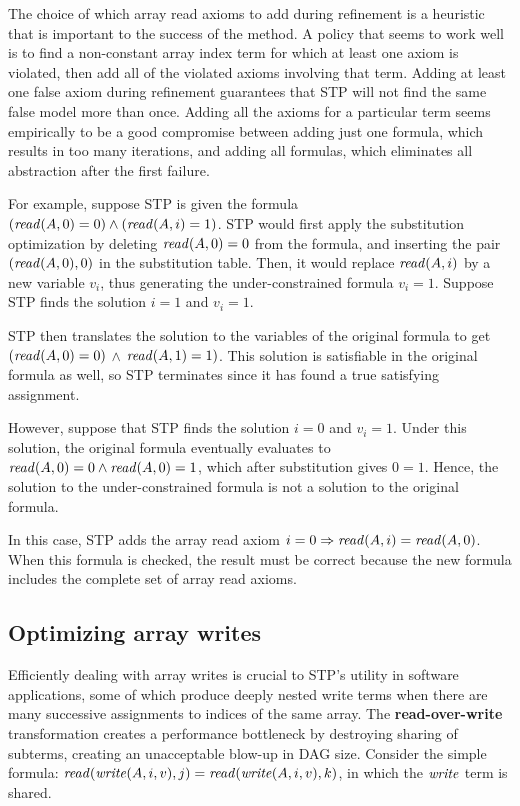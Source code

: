 The choice of which array read axioms to add during refinement is a
heuristic that is important to the success of the method.  A policy
that seems to work well is to find a non-constant array index term for
which at least one axiom is violated, then add all of the violated
axioms involving that term.  Adding at least one false axiom during
refinement guarantees that STP will not find the same false model more
than once.  Adding all the axioms for a particular term seems
empirically to be a good compromise between adding just one formula,
which results in too many iterations, and adding all formulas, which
eliminates all abstraction after the first failure.

For example, suppose STP is given the formula $({\it read}(A, 0) = 0)
\wedge ({\it read}(A, i) = 1)$.  STP would first apply the substitution
optimization by deleting ${\it read}(A, 0) = 0$ from the formula, and
inserting the pair $({\it read}(A, 0), 0)$ in the substitution
table. Then, it would replace ${\it read}(A, i)$ by a new variable
$v_i$, thus generating the under-constrained formula $v_i = 1$.
Suppose STP finds the solution $i = 1$ and $v_i = 1$.

STP then translates the solution to the variables of the original
formula to get $({\it read}(A, 0) = 0)$ $\wedge$ ${\it read}(A, 1) = 1)$.
This solution is satisfiable in the original formula as well, so STP
terminates since it has found a true satisfying assignment.

However, suppose that STP finds the solution $i = 0$ and $v_i = 1$.
Under this solution, the original formula eventually evaluates to
${\it read}(A,0) = 0 \wedge {\it read}(A, 0) = 1$, which after
substitution gives $0=1$. Hence, the solution to the under-constrained
formula is not a solution to the original formula.

In this case, STP adds the array read axiom $i=0 \Rightarrow
{\it read}(A, i) = {\it read}(A, 0)$.  When this formula is checked, the
result must be correct because the new formula includes the complete
set of array read axioms.

\subsection{Optimizing array writes}

Efficiently dealing with array writes is crucial to STP's utility in
software applications, some of which produce deeply nested write terms
when there are many successive assignments to indices of the same array.
The {\bf read-over-write} transformation
creates a performance bottleneck by destroying sharing of subterms,
creating an unacceptable blow-up in DAG size.
Consider the simple formula:
${\it read}({\it write}(A,i,v),j) = {\it read}({\it write}(A,i,v),k)$, in
which the ${\it write}$ term is shared.

